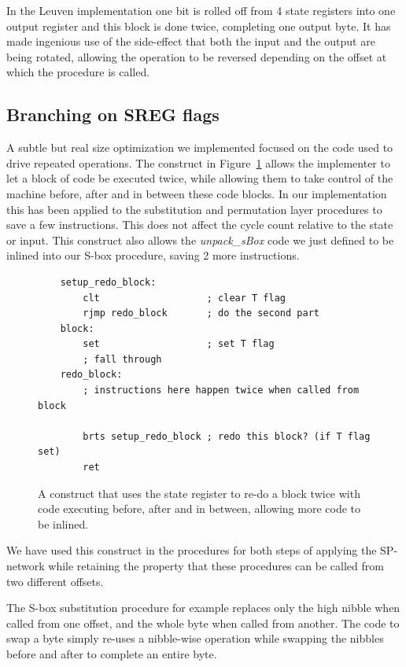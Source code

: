 \documentclass[11pt]{article}
\begin{document}
In the Leuven implementation one bit is rolled off from 4 state registers into one output register and this block is done twice, completing one output byte. It has made ingenious use of the side-effect that both the input and the output are being rotated, allowing the operation to be reversed depending on the offset at which the procedure is called.

\subsection{Branching on SREG flags}
A subtle but real size optimization we implemented focused on the code used to drive repeated operations.
The construct in Figure~\ref{sreg_redo} allows the implementer to let a block of code be executed twice, while allowing them to take control of the machine before, after and in between these code blocks.
In our implementation this has been applied to the substitution and permutation layer procedures to save a few instructions.
This does not affect the cycle count relative to the state or input.
This construct also allows the \textit{unpack\_sBox} code we just defined to be inlined into our S-box procedure, saving 2 more instructions.

\begin{figure}
	\begin{lstlisting}
	setup_redo_block:
		clt                   ; clear T flag
		rjmp redo_block       ; do the second part
	block:
		set                   ; set T flag
		; fall through
	redo_block:
		; instructions here happen twice when called from block

		brts setup_redo_block ; redo this block? (if T flag set)
		ret
	\end{lstlisting}
	\caption{A construct that uses the state register to re-do a block twice with code executing before, after and in between, allowing more code to be inlined.}
\label{sreg_redo}
\end{figure}

We have used this construct in the procedures for both steps of applying the SP-network while retaining the property that these procedures can be called from two different offsets.

The S-box substitution procedure for example replaces only the high nibble when called from one offset, and the whole byte when called from another.
The code to swap a byte simply re-uses a nibble-wise operation while swapping the nibbles before and after to complete an entire byte.
\end{document}
